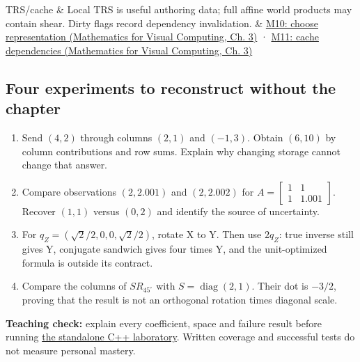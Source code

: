 {\begin{longtable}[]
TRS/cache & Local TRS is useful authoring data; full affine world products may contain shear. Dirty flags record dependency invalidation. & \href{../02-Mathematics-for-Visual-Computing/main.pdf\#nameddest=01-foundations-i-ch019-figure-m10---representation-follows-the-permitted-operation}{M10: choose representation (Mathematics for Visual Computing, Ch. 3)} · \href{../02-Mathematics-for-Visual-Computing/main.pdf\#nameddest=01-foundations-i-ch019-figure-m11---invalidate-the-values-that-actually-depend-on-the-edit}{M11: cache dependencies (Mathematics for Visual Computing, Ch. 3)} \\
\end{longtable}
}

\subsection{Four experiments to reconstruct without the chapter}\label{appendix-68f22c734be3-four-experiments-to-reconstruct-without-the-chapter}

\begin{enumerate}
\def\labelenumi{\arabic{enumi}.}
\tightlist
\item
  Send \((4,2)\) through columns \((2,1)\) and \((-1,3)\). Obtain \((6,10)\) by column contributions and row sums. Explain why changing storage cannot change that answer.
\item
  Compare observations \((2,2.001)\) and \((2,2.002)\) for \(A=\begin{bmatrix}1&1\\1&1.001\end{bmatrix}\). Recover \((1,1)\) versus \((0,2)\) and identify the source of uncertainty.
\item
  For \(q_Z=(\sqrt2/2,0,0,\sqrt2/2)\), rotate X to Y. Then use \(2q_Z\): true inverse still gives Y, conjugate sandwich gives four times Y, and the unit-optimized formula is outside its contract.
\item
  Compare the columns of \(S R_{45^\circ}\) with \(S=\operatorname{diag}(2,1)\). Their dot is \(-3/2\), proving that the result is not an orthogonal rotation times diagonal scale.
\end{enumerate}

\textbf{Teaching check:} explain every coefficient, space and failure result before running \hyperref[02-foundations-ii-ch038-a-complete-scalar-laboratory-makes-the-contracts-observable]{the standalone C++ laboratory}. Written coverage and successful tests do not measure personal mastery.

